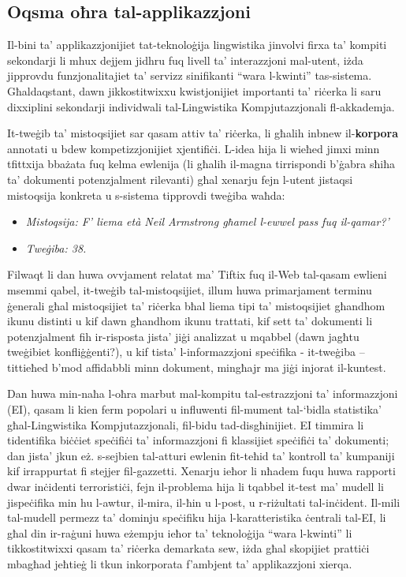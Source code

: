 \documentclass[]{../../metanetpaper}
\begin{document}
\begin{multicols}{2}
\subsection{Oqsma oħra tal-applikazzjoni}

Il-bini ta’ applikazzjonijiet tat-teknoloġija lingwistika jinvolvi firxa ta’ kompiti sekondarji li mhux dejjem jidhru fuq livell ta’ interazzjoni mal-utent, iżda jipprovdu funzjonalitajiet ta’ servizz sinifikanti ``wara l-kwinti'' tas-sistema. Għaldaqstant, dawn jikkostitwixxu kwistjonijiet importanti ta’ riċerka li saru dixxiplini sekondarji individwali tal-Lingwistika Kompjutazzjonali fl-akkademja.

It-tweġib ta’ mistoqsijiet sar qasam attiv ta’ riċerka, li għalih  inbnew il-\textbf{korpora} annotati u bdew kompetizzjonijiet xjentifiċi. L-idea hija li wieħed jimxi minn tfittxija bbażata fuq  kelma ewlenija (li għalih il-magna tirrispondi b’ġabra sħiħa ta’ dokumenti potenzjalment rilevanti) għal xenarju fejn l-utent jistaqsi mistoqsija konkreta u s-sistema tipprovdi tweġiba waħda: 

\begin{itemize}
\item[] \textit{Mistoqsija: F’ liema età Neil Armstrong għamel l-ewwel pass fuq il-qamar?'}\\
\item[] \textit{Tweġiba: 38.}
\end{itemize}

Filwaqt li dan huwa ovvjament relatat ma’ Tiftix fuq il-Web tal-qasam ewlieni msemmi qabel, it-tweġib tal-mistoqsijiet, illum huwa primarjament terminu ġenerali għal mistoqsijiet ta’ riċerka bħal liema tipi ta’ mistoqsijiet għandhom ikunu distinti u kif dawn għandhom ikunu trattati, kif sett ta’ dokumenti li potenzjalment fih ir-risposta jista’ jiġi analizzat u mqabbel (dawn jagħtu tweġibiet konfliġġenti?), u kif tista’ l-informazzjoni speċifika - it-tweġiba – tittieħed b’mod affidabbli minn dokument, mingħajr ma jiġi injorat il-kuntest.


Dan huwa min-naħa l-oħra marbut mal-kompitu tal-estrazzjoni ta’ informazzjoni (EI), qasam li kien ferm popolari u influwenti fil-mument tal-‘bidla statistika’ għal-Lingwistika Kompjutazzjonali, fil-bidu tad-disgħinijiet. EI timmira li tidentifika biċċiet speċifiċi ta’ informazzjoni fi klassijiet speċifiċi ta’ dokumenti; dan jista’ jkun eż. s-sejbien tal-atturi ewlenin fit-teħid ta’ kontroll ta’ kumpaniji kif irrappurtat fi stejjer fil-gazzetti. Xenarju ieħor li nħadem fuqu huwa rapporti dwar inċidenti terroristiċi, fejn il-problema hija li tqabbel it-test ma’ mudell li jispeċifika min hu l-awtur, il-mira, il-ħin u l-post, u r-riżultati tal-inċident. Il-mili tal-mudell permezz ta’ dominju speċifiku hija l-karatteristika ċentrali tal-EI, li għal din ir-raġuni huwa eżempju ieħor ta’ teknoloġija ``wara l-kwinti'' li tikkostitwixxi qasam ta’ riċerka demarkata sew, iżda għal skopijiet prattiċi mbagħad jeħtieġ li tkun inkorporata f’ambjent ta’ applikazzjoni xierqa.


\end{multicols}
\end{document}
